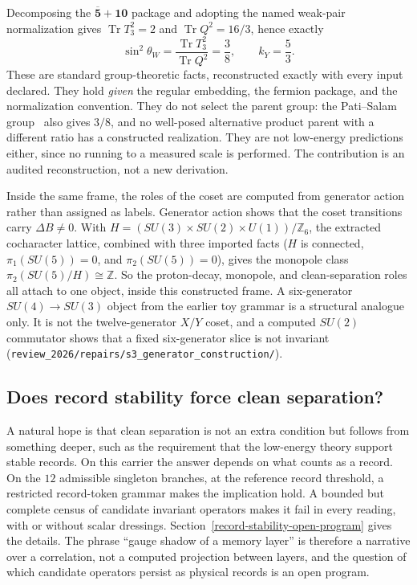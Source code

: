\documentclass[11pt]{article}
\theoremstyle{definition}
\begin{document}
Decomposing the \(\overline{\mathbf5}+\mathbf{10}\) package and adopting the named weak-pair normalization gives
\(\operatorname{Tr}T_3^2=2\) and \(\operatorname{Tr}Q^2=16/3\), hence exactly
\[
\sin^2\theta_W=\frac{\operatorname{Tr}T_3^2}{\operatorname{Tr}Q^2}=\frac38,
\qquad k_Y=\frac53 .
\]
These are standard group-theoretic facts, reconstructed exactly with every input declared. They hold \emph{given} the
regular embedding, the fermion package, and the normalization convention. They do not select the parent group: the
Pati--Salam group~\citep{PatiSalam1974} also gives \(3/8\), and no well-posed alternative product parent with a
different ratio has a constructed realization. They are not low-energy predictions either, since no running to a
measured scale is performed. The contribution is an audited reconstruction, not a new derivation.

Inside the same frame, the roles of the coset are computed from generator action rather than assigned as labels.
Generator action shows that the coset transitions carry \(\Delta B\neq0\). With
\(H=(SU(3)\times SU(2)\times U(1))/\mathbb Z_6\), the extracted cocharacter lattice, combined with three imported
facts (\(H\) is connected, \(\pi_1(SU(5))=0\), and \(\pi_2(SU(5))=0\)), gives the monopole class
\(\pi_2(SU(5)/H)\cong\mathbb Z\). So the
proton-decay, monopole, and clean-separation roles all attach to one object, inside this constructed frame. A
six-generator \(SU(4)\to SU(3)\) object from the earlier toy grammar is a structural analogue only. It is not the
twelve-generator \(X/Y\) coset, and a computed \(SU(2)\) commutator shows that a fixed six-generator slice is not
invariant (\nolinkurl{review_2026/repairs/s3_generator_construction/}).

\subsection{Does record stability force clean separation?}\label{grounding-the-condition-record-stability}

A natural hope is that clean separation is not an extra condition but follows from something deeper, such as the
requirement that the low-energy theory support stable records. On this carrier the answer depends on what counts as a
record. On the \(12\) admissible singleton branches, at the reference record threshold, a restricted record-token grammar
makes the implication hold. A bounded but complete census of candidate invariant operators makes it fail in every
reading, with or without scalar dressings.
Section~\ref{record-stability-open-program} gives the details. The phrase ``gauge shadow of a memory layer'' is
therefore a narrative over a correlation, not a computed projection between layers, and the question of which
candidate operators persist as physical records is an open program.
\end{document}
